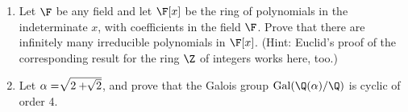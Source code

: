 \documentclass{article}
\begin{document}
\begin{enumerate}
 \item Let $\F$ be any field and let $\F[x]$ be the ring of polynomials in the
indeterminate $x$, with coefficients in the field $\F$. Prove that there are
infinitely many irreducible polynomials in $\F[x]$. (Hint: Euclid's proof of the
corresponding result for the ring $\Z$ of integers works here, too.)

\item Let $\alpha=\root\of{2+\root\of 2}$, and prove that the
Galois group ${\rm Gal}(\Q(\alpha)/\Q)$ is cyclic of order 4.






    
\end{enumerate}
\end{document}
